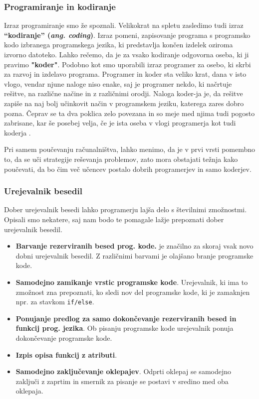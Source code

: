 \subsubsection{Programiranje in kodiranje}
\label{sec:programiranje_kodiranje}

Izraz programiranje smo že spoznali. Velikokrat na spletu zasledimo
tudi izraz \textbf{``kodiranje'' (\emph{ang. coding})}. Izraz pomeni,
zapisovanje programa s programsko kodo izbranega programskega jezika,
ki predstavlja končen izdelek oziroma izvorno datoteko. Lahko rečemo,
da je za vsako kodiranje odgovorna oseba, ki ji pravimo
\textbf{"koder"}. Podobno kot smo uporabili izraz programer za osebo,
ki skrbi za razvoj in izdelavo programa. Programer in koder sta veliko
krat, dana v isto vlogo, vendar njune naloge niso enake, saj je
programer nekdo, ki načrtuje rešitve, na različne načine in z
različnimi orodji. Naloga koder-ja je, da rešitve zapiše na naj bolj
učinkovit način v programskem jeziku, katerega zares dobro
pozna. Čeprav se ta dva poklica zelo povezana in so meje med njima
tudi pogosto zabrisane, kar še posebej velja, če je ista oseba v vlogi
programerja kot tudi koderja \cite{web:coder}.

Pri samem poučevanju računalništva, lahko menimo, da je v prvi vrsti
pomembno to, da se uči strategije reševanja problemov, zato mora
obstajati težnja kako poučevati, da bo čim več učencev postalo dobrih
programerjev in samo koderjev.

\subsubsection{Urejevalnik besedil}
\label{sec:urejevalnik_besedil}

Dober urejevalnik besedi lahko programerju lajša delo s številnimi
zmožnostmi. Opisali smo nekatere, saj nam bodo te pomagale lažje
prepoznati dober urejevalnik besedil.


\begin{itemize}
\item \textbf{Barvanje rezerviranih besed prog. kode.} je značilno za
  skoraj vsak novo dobni urejevalnik besedil. Z različnimi barvami je
  olajšano branje programske kode.
\item \textbf{Samodejno zamikanje vrstic programske
    kode}. Urejevalnik, ki ima to zmožnost zna prepoznati, ko sledi
  nov del programske kode, ki je zamaknjen npr. za stavkom
  \texttt{if/else}.
\item \textbf{Ponujanje predlog za samo dokončevanje rezerviranih
    besed in funkcij prog. jezika}. Ob pisanju programske kode
  urejevalnik ponuja dokončevanje programske kode.
\item \textbf{Izpis opisa funkcij z atributi}. 
\item \textbf{Samodejno zaključevanje oklepajev}. Odprti oklepaj se
  samodejno zaključi z zaprtim in smernik za pisanje se postavi v
  sredino med oba oklepaja. 
\end{itemize}

